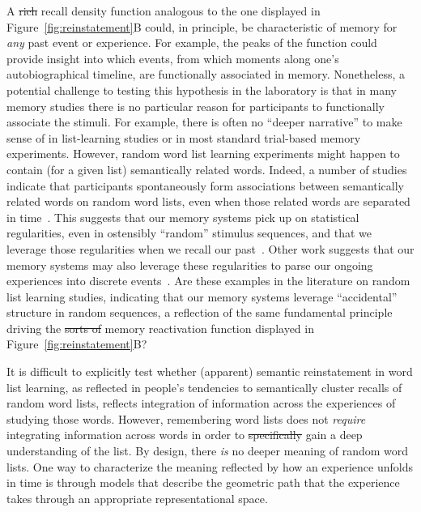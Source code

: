 \documentclass{article}
\providecommand{\DIFaddtex}[1]{{\protect\color{blue}\uwave{#1}}} %
\providecommand{\DIFdeltex}[1]{{\protect\color{red}\sout{#1}}}                      %
\providecommand{\DIFaddbegin}{} %
\providecommand{\DIFaddend}{} %
\providecommand{\DIFdelbegin}{} %
\providecommand{\DIFdelend}{} %
\providecommand{\DIFadd}[1]{\texorpdfstring{\DIFaddtex{#1}}{#1}} %
\providecommand{\DIFdel}[1]{\texorpdfstring{\DIFdeltex{#1}}{}} %
\newcommand{\DIFscaledelfig}{0.5}
\newlength{\DIFdelgraphicswidth} %
\newlength{\DIFdelgraphicsheight} %
\newcommand{\DIFaddincludegraphics}[2][]{{\color{blue}\fbox{\DIFOincludegraphics[#1]{#2}}}} %
\newcommand{\DIFdelincludegraphics}[2][]{%
\sbox{\DIFdelgraphicsbox}{\DIFOincludegraphics[#1]{#2}}%
\settoboxwidth{\DIFdelgraphicswidth}{\DIFdelgraphicsbox} %
\settoboxtotalheight{\DIFdelgraphicsheight}{\DIFdelgraphicsbox} %
\scalebox{\DIFscaledelfig}{%
\parbox[b]{\DIFdelgraphicswidth}{\usebox{\DIFdelgraphicsbox}\\[-\baselineskip] \rule{\DIFdelgraphicswidth}{0em}}\llap{\resizebox{\DIFdelgraphicswidth}{\DIFdelgraphicsheight}{%
\setlength{\unitlength}{\DIFdelgraphicswidth}%
\begin{picture}(1,1)%
\thicklines\linethickness{2pt} %
{\color[rgb]{1,0,0}\put(0,0){\framebox(1,1){}}}%
{\color[rgb]{1,0,0}\put(0,0){\line( 1,1){1}}}%
{\color[rgb]{1,0,0}\put(0,1){\line(1,-1){1}}}%
\end{picture}%
}\hspace*{3pt}}} %
} %
\DeclareRobustCommand{\DIFaddbegin}{\DIFOaddbegin \let\includegraphics\DIFaddincludegraphics} %
\DeclareRobustCommand{\DIFaddend}{\DIFOaddend \let\includegraphics\DIFOincludegraphics} %
\DeclareRobustCommand{\DIFdelbegin}{\DIFOdelbegin \let\includegraphics\DIFdelincludegraphics} %
\DeclareRobustCommand{\DIFdelend}{\DIFOaddend \let\includegraphics\DIFOincludegraphics} %
\begin{document}
A \DIFdelbegin \DIFdel{rich }\DIFdelend recall density function analogous to the one displayed in Figure~\ref{fig:reinstatement}B could, in principle, be characteristic of memory for \textit{any} past event or experience.  For example, the peaks of the function could provide insight into which events, from which moments along one's autobiographical timeline, are functionally associated in memory.  Nonetheless, a potential challenge to testing this hypothesis in the laboratory is that in many memory studies there is no particular reason for participants to functionally associate the stimuli.  For example, there is often no ``deeper narrative'' to make sense of in list-learning studies or in most standard trial-based memory experiments.  However, random word list learning experiments might happen to contain (for a given list) semantically related words.  Indeed, a number of studies indicate that participants spontaneously form associations between semantically related words on random word lists, even when those related words are separated in time~\citep[e.g.,][]{WixtRohr94, MannKaha12, MannEtal12}.  This suggests that our memory systems pick up on statistical regularities, even in ostensibly ``random'' stimulus sequences, and that we leverage those regularities when we recall our past~\citep{PolyEtal09}.  Other work suggests that our memory systems may also leverage these regularities to parse our ongoing experiences into discrete events~\citep{SchaEtal13, Shap19}.  Are these examples in the literature on random list learning studies, indicating that our memory systems leverage ``accidental'' structure in random sequences, a reflection of the same fundamental principle driving the \DIFdelbegin \DIFdel{sorts of }\DIFdelend memory reactivation function displayed in Figure~\ref{fig:reinstatement}B?

It is difficult to explicitly test whether (apparent) semantic reinstatement in word list learning, as reflected in people's tendencies to semantically cluster recalls of random word lists, reflects integration of information across the experiences of studying those words.  However, remembering word lists does not \DIFaddbegin \DIFadd{specifically }\DIFaddend \textit{require} integrating information across words in order to \DIFdelbegin \DIFdel{specifically }\DIFdelend gain a deep understanding of the list.  By design, there \textit{is} no deeper meaning of random word lists.  One way to characterize the meaning reflected by how an experience unfolds in time is through models that describe the geometric path that the experience takes through an appropriate representational space.
\end{document}
